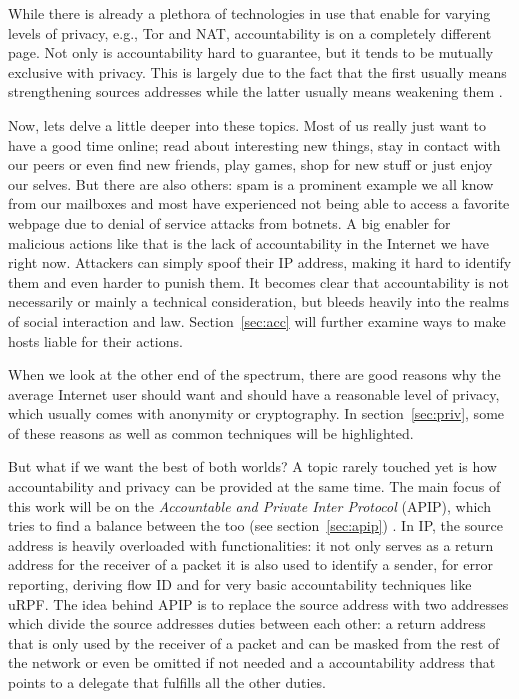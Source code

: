 \documentclass{acm_proc_article-sp}
\begin{document}
While there is already a plethora of technologies in use that enable for varying levels of privacy, e.g., Tor and NAT, accountability is on a completely different page. Not only is accountability hard to guarantee, but it tends to be mutually exclusive with privacy. This is largely due to the fact that the first usually means strengthening sources addresses while the latter usually means weakening them \cite{apip}.

Now, lets delve a little deeper into these topics. Most of us really just want to have a good time online; read about interesting new things, stay in contact with our peers or even find new friends, play games, shop for new stuff or just enjoy our selves. But there are also others: spam is a prominent example we all know from our mailboxes and most have experienced not being able to access a favorite webpage due to denial of service attacks from botnets. A big enabler for malicious actions like that is the lack of accountability in the Internet we have right now. Attackers can simply spoof their IP address, making it hard to identify them and even harder to punish them. It becomes clear that accountability is not necessarily or mainly a technical consideration, but bleeds heavily into the realms of social interaction and law. Section~\ref{sec:acc} will further examine ways to make hosts liable for their actions.

When we look at the other end of the spectrum, there are good reasons why the average Internet user should want and should have a reasonable level of privacy, which usually comes with anonymity or cryptography. In section~\ref{sec:priv}, some of these reasons as well as common techniques will be highlighted.

But what if we want the best of both worlds? A topic rarely touched yet is how accountability and privacy can be provided at the same time. The main focus of this work will be on the \emph{Accountable and Private Inter Protocol} (APIP), which tries to find a balance between the too (see section~\ref{sec:apip}) \cite{apip}. In IP, the source address is heavily overloaded with functionalities: it not only serves as a return address for the receiver of a packet it is also used to identify a sender, for error reporting, deriving flow ID and for very basic accountability techniques like uRPF. The idea behind APIP is to replace the source address with two addresses which divide the source addresses duties between each other: a return address that is only used by the receiver of a packet and can be masked from the rest of the network or even be omitted if not needed and a accountability address that points to a delegate that fulfills all the other duties.
\end{document}
